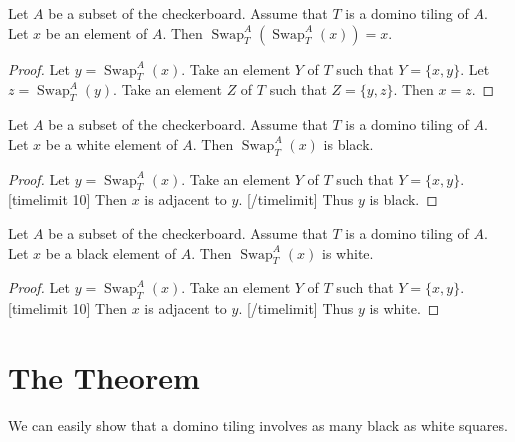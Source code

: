 \documentclass[english]{article}
\newcommand{\Sw}[3]{\operatorname{Swap}_{#1}^{#2}(#3)}
\begin{document}
\begin{forthel}
    \begin{lemma}
        Let $A$ be a subset of the checkerboard.
        Assume that $T$ is a domino tiling of $A$.
        Let $x$ be an element of $A$.
        Then $\Sw{T}{A}{\Sw{T}{A}{x}} = x$.
    \end{lemma}
    \begin{proof}
        Let $y = \Sw{T}{A}{x}$.
        Take an element $Y$ of $T$ such that $Y = \{x, y\}$.
        Let $z = \Sw{T}{A}{y}$.
        Take an element $Z$ of $T$ such that $Z = \{y, z\}$.
        Then $x = z$.
    \end{proof}

    \begin{lemma}
        Let $A$ be a subset of the checkerboard.
        Assume that $T$ is a domino tiling of $A$.
        Let $x$ be a white element of $A$.
        Then $\Sw{T}{A}{x}$ is black.
    \end{lemma}
    \begin{proof}
        Let $y = \Sw{T}{A}{x}$.
        Take an element $Y$ of $T$ such that $Y = \{x,y\}$.
        [timelimit 10]
        Then $x$ is adjacent to $y$. 
        [/timelimit]
        Thus $y$ is black.
    \end{proof}

    \begin{lemma}
        Let $A$ be a subset of the checkerboard.
        Assume that $T$ is a domino tiling of $A$.
        Let $x$ be a black element of $A$.
        Then $\Sw{T}{A}{x}$ is white.
    \end{lemma}
    \begin{proof}
        Let $y = \Sw{T}{A}{x}$.
        Take an element $Y$ of $T$ such that $Y = \{x,y\}$.
        [timelimit 10]
        Then $x$ is adjacent to $y$. 
        [/timelimit]
        Thus $y$ is white.
    \end{proof}
\end{forthel}

\section{The Theorem}

\noindent We can easily show that a domino tiling involves as many black as white squares.
\end{document}
